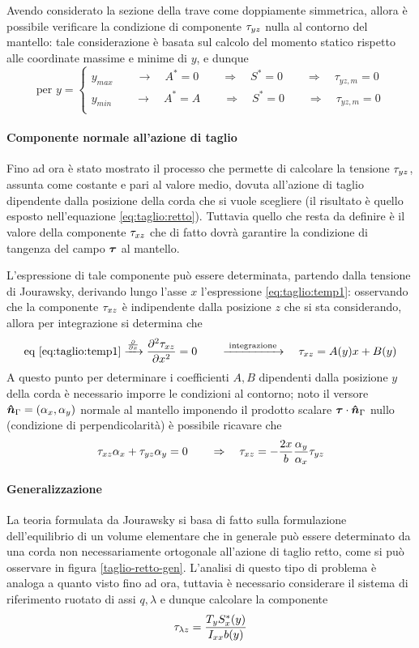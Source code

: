 		Avendo considerato la sezione della trave come doppiamente simmetrica, allora è possibile verificare la condizione di componente $\tau_{yz}$ nulla al contorno del mantello: tale considerazione è basata sul calcolo del momento statico rispetto alle coordinate massime e minime di $y$, e dunque
		\[ \textrm{per } y = \begin{cases}
			y_{max} \qquad \rightarrow \quad A^* = 0 \qquad \Rightarrow \quad S^* = 0 \qquad \Rightarrow \quad \tau_{yz,m} = 0 \\
			y_{min} \qquad \rightarrow \quad A^* = A \qquad \Rightarrow \quad S^* = 0 \qquad \Rightarrow \quad \tau_{yz,m} = 0 \\
		\end{cases}\]
		
		\paragraph{Componente normale all'azione di taglio} Fino ad ora è stato mostrato il processo che permette di calcolare la tensione $\tau_{yz}$, assunta come costante e pari al valore medio, dovuta all'azione di taglio dipendente dalla posizione della corda che si vuole scegliere (il risultato è quello esposto nell'equazione \ref{eq:taglio:retto}). Tuttavia quello che resta da definire è il valore della componente $\tau_{xz}$ che di fatto dovrà garantire la condizione di tangenza del campo $\boldsymbol{\tau}$ al mantello.
		
		L'espressione di tale componente può essere determinata, partendo dalla tensione di Jourawsky, derivando lungo l'asse $x$ l'espressione \ref{eq:taglio:temp1}: osservando che la componente $\tau_{xz}$ è indipendente dalla posizione $z$ che si sta considerando, allora per integrazione si determina che
		\[ \textrm{eq \ref{eq:taglio:temp1}}\xrightarrow{\frac{\partial }{\partial x} } \frac{\partial ^2\tau_{xz}}{\partial x^2} = 0 \qquad \xrightarrow{\textrm{ integrazione }} \quad \tau_{xz} = A(y) x + B(y)  \]
		A questo punto per determinare i coefficienti $A,B$ dipendenti dalla posizione $y$ della corda è necessario imporre le condizioni al contorno; noto il versore $\boldsymbol{\hat{n}}_\Gamma = (\alpha_x,\alpha_y)$ normale al mantello imponendo il prodotto scalare $\boldsymbol{\tau} \cdot \boldsymbol{\hat{n}}_\Gamma$ nullo (condizione di perpendicolarità) è possibile ricavare che
		\[ \tau_{xz} \alpha_x + \tau_{yz} \alpha_y = 0\qquad \Rightarrow \quad \tau_{xz} = -\frac{2x}{b} \frac{\alpha_y}{\alpha_x} \tau_{yz} \]
		
		\paragraph{Generalizzazione} La teoria formulata da Jourawsky si basa di fatto sulla formulazione dell'equilibrio di un volume elementare che in generale può essere determinato da una corda non necessariamente ortogonale all'azione di taglio retto, come si può osservare in figura \ref{taglio-retto-gen}. L'analisi di questo tipo di problema è analoga a quanto visto fino ad ora, tuttavia è necessario considerare il sistema di riferimento ruotato di assi $q,\lambda$ e dunque calcolare la componente
		\[\tau_{\lambda z} = \frac{T_y S_x^*(y)}{I_{xx} b(y)}\]
		
